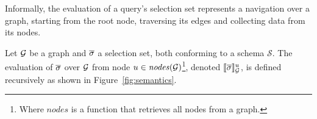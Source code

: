 






Informally, the evaluation of a query's selection set represents a navigation over a graph, starting from the root node, traversing its edges and collecting data from its nodes. %

\begin{definition}
Let $\mathcal{G}$ be a graph and $\overline{\sigma}$ a selection set, both conforming to a schema $\mathcal{S}$. The evaluation of $\overline{\sigma}$ over $\mathcal{G}$ from node $u \in \mathit{nodes}(\mathcal{G})$\footnote{Where $\mathit{nodes}$ is a function that retrieves all nodes from a graph.}, denoted $\llbracket \overline{\sigma} \rrbracket^{u}_{\mathcal{G}}$, is defined recursively as shown in Figure~\ref{fig:semantics}. 
\end{definition}

